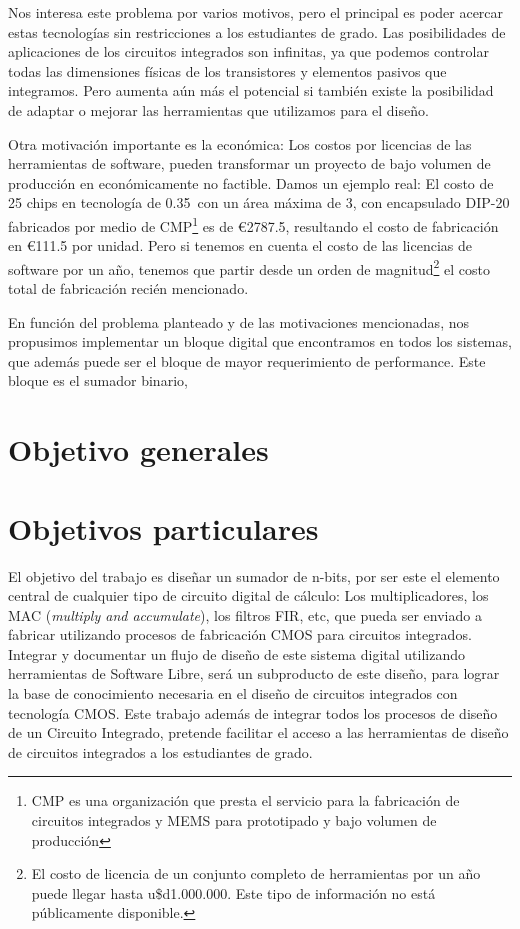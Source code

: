 Nos interesa este problema por varios motivos, pero el principal es poder acercar estas tecnologías sin restricciones a los estudiantes de grado. Las posibilidades de aplicaciones de los circuitos integrados son infinitas, ya que podemos controlar todas las dimensiones físicas de los transistores y elementos pasivos que integramos. Pero aumenta aún más el potencial si también existe la posibilidad de adaptar o mejorar las herramientas que utilizamos para el diseño. 

Otra motivación importante es la económica: Los costos por licencias de las herramientas de software, pueden transformar un proyecto de bajo volumen de producción en económicamente no factible. Damos un ejemplo real:
El costo de 25 chips en tecnología de 0.35~\microm con un área máxima de 3\mmcuadrado, con encapsulado DIP-20 fabricados por medio de CMP\footnote{CMP es una organización que presta el servicio para la fabricación de circuitos integrados y MEMS para prototipado y bajo volumen de producción} es de \euro{2787.5}, resultando el costo de fabricación en \euro{111.5} por unidad. Pero si tenemos en cuenta el costo de las licencias de software por un año, tenemos que partir desde un orden de magnitud\footnote{El costo de licencia de un conjunto completo de herramientas por un año puede llegar hasta u\$d1.000.000. Este tipo de información no está públicamente disponible.} el costo total de fabricación recién mencionado.

En función del problema planteado y de las motivaciones mencionadas, nos propusimos implementar un bloque digital que encontramos en todos los sistemas, que además puede ser el bloque de mayor requerimiento de performance. Este bloque es el sumador binario,    
  
\section{Objetivo generales}


\section{Objetivos particulares}
El objetivo del trabajo es diseñar un sumador de n-bits, por ser este el elemento central de cualquier tipo de circuito digital de cálculo: Los multiplicadores, los MAC (\emph{multiply and accumulate}), los filtros FIR, etc, que pueda ser enviado a fabricar utilizando
procesos de fabricación CMOS para circuitos integrados. Integrar y documentar un flujo de diseño
de este sistema digital utilizando herramientas de Software Libre, será un subproducto de este
diseño, para lograr la base de conocimiento necesaria en el diseño de circuitos integrados con
tecnología CMOS. Este trabajo además de integrar todos los procesos de diseño de un Circuito
Integrado, pretende facilitar el acceso a las herramientas de diseño de circuitos integrados a los estudiantes de grado.
